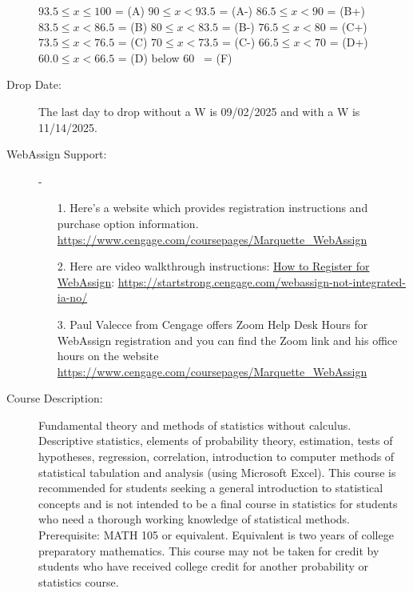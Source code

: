 \documentclass[10pt]{article}
\begin{document}
\begin{description}
\hspace*{7.5mm} $93.5\leq x\leq 100$\hspace*{2.9mm}  = (A) \hspace*{10mm} $90\leq x<93.5$ = (A-) \hspace*{10mm} $86.5\leq x<90$ = (B+)\\
\hspace*{7.5mm} $83.5\leq x<86.5$\hspace*{2mm} = (B) \hspace*{10mm} $80\leq x<83.5$ = (B-) \hspace*{10mm} $76.5\leq x<80$ = (C+)\\
\hspace*{7.5mm} $73.5\leq x<76.5$\hspace*{2mm} = (C) \hspace*{10mm} $70\leq x<73.5$ = (C-) \hspace*{10mm} $66.5\leq x<70$ = (D+)\\
\hspace*{7.5mm} $60.0\leq x<66.5$\hspace*{2mm} = (D) \hspace*{10mm} below $60$ \hspace*{5mm}  \ = (F)\vspace{-.05in}

\item[Drop Date:] The last day to drop without a W is 09/02/2025 and with a W is 11/14/2025.

\item[WebAssign Support:] - 
\begin{enumerate}
\item[1.] Here’s a website which provides registration instructions and purchase option information. \url{https://www.cengage.com/coursepages/Marquette_WebAssign}
\item[2.] Here are video walkthrough instructions: \href{https://startstrong.cengage.com/webassign-not-integrated-ia-no/}{How to Register for WebAssign}: \url{https://startstrong.cengage.com/webassign-not-integrated-ia-no/}
\item[3.] Paul Valecce from Cengage offers Zoom Help Desk Hours for WebAssign registration and you can find the Zoom link and his office hours on the website \url{https://www.cengage.com/coursepages/Marquette_WebAssign}
\end{enumerate}

\item[Course Description:] Fundamental theory and methods of statistics without calculus. Descriptive statistics, elements of probability theory, estimation, tests of hypotheses, regression, correlation, introduction to computer methods of statistical tabulation and analysis (using Microsoft Excel). This course is recommended for students seeking a general introduction to statistical concepts and is not intended to be a final course in statistics for students who need a thorough working knowledge of statistical methods. Prerequisite: MATH 105 or equivalent. Equivalent is two years of college preparatory mathematics. This course may not be taken for credit by students who have received college credit for another probability or statistics course.


\end{description}
\end{document}
